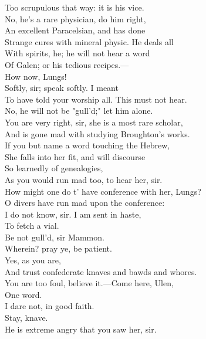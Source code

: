 \documentclass[a4paper,oneside]{memoir}
\begin{document}
\begin{drama*}
Too scrupulous that way: it is his vice.\\
No, he's a rare physician, do him right,\\
An excellent Paracelsian, and has done\\
Strange cures with mineral physic. He deals all\\
With spirits, he; he will not hear a word\\
Of Galen; or his tedious recipes.---\\
How now, Lungs!\\
\facespeaks {} Softly, sir; speak softly. I meant\\
To have told your worship all. This must not hear.\\
\mammonspeaks No, he will not be "gull'd;" let him alone.\\
\facespeaks You are very right, sir, she is a most rare scholar,\\
And is gone mad with studying Broughton's works.\\
If you but name a word touching the Hebrew,\\
She falls into her fit, and will discourse\\
So learnedly of genealogies,\\
As you would run mad too, to hear her, sir.\\
\mammonspeaks How might one do t' have conference with her, Lungs?\\
\facespeaks O divers have run mad upon the conference:\\
I do not know, sir. I am sent in haste,\\
To fetch a vial.\\
\surlyspeaks {} Be not gull'd, sir Mammon.\\
\mammonspeaks Wherein? pray ye, be patient.\\
\surlyspeaks {} Yes, as you are,\\
And trust confederate knaves and bawds and whores.\\
\mammonspeaks You are too foul, believe it.---Come here, Ulen,\\
One word.\\
\facespeaks {} I dare not, in good faith.\\
\mammonspeaks {} Stay, knave.\\
\facespeaks He is extreme angry that you saw her, sir.\\

\end{drama*}
\end{document}

